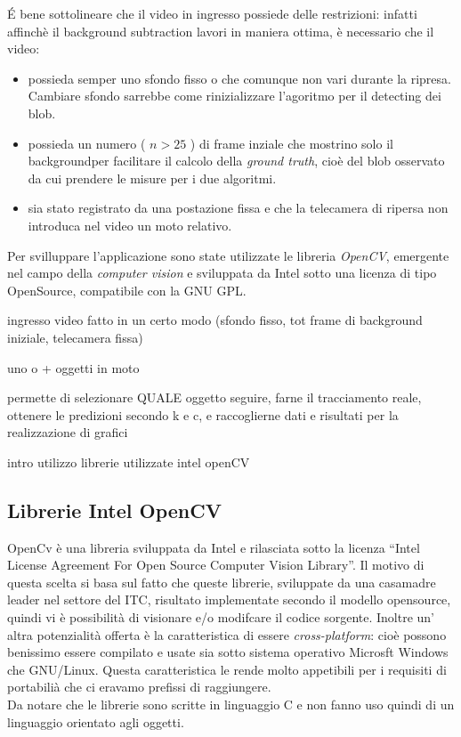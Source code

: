 \'E bene sottolineare che il video in ingresso possiede delle restrizioni: infatti affinchè il background subtraction lavori in maniera ottima, è necessario che il video:
\begin{itemize}
 \item possieda semper uno sfondo fisso o che comunque non vari durante la ripresa. Cambiare sfondo sarrebbe come rinizializzare l'agoritmo per il detecting dei blob.
\item possieda un numero ( $n > 25 $ ) di frame inziale che mostrino solo il backgroundper facilitare il calcolo della \textit{ground truth}, cioè del blob osservato da cui prendere le misure per i due algoritmi.
\item sia stato registrato da una postazione fissa e che la telecamera di ripersa non introduca nel video un moto relativo.
 \end{itemize}

Per svilluppare l'applicazione sono state utilizzate le libreria \textit{OpenCV}, emergente nel campo della \textit{computer vision}  e sviluppata da Intel sotto una licenza di tipo OpenSource, compatibile con la GNU GPL.


ingresso video fatto in un certo modo (sfondo fisso, tot frame di background iniziale, telecamera fissa)

uno o + oggetti in moto

permette di selezionare QUALE oggetto seguire, farne il tracciamento reale, ottenere le predizioni secondo k e c, e raccoglierne dati e risultati per la realizzazione di grafici

intro utilizzo librerie utilizzate intel openCV
\subsection{Librerie Intel OpenCV}
OpenCv è una libreria sviluppata da Intel e rilasciata sotto la licenza ``Intel License Agreement For Open Source Computer Vision Library''. Il motivo di questa scelta si basa sul fatto che queste librerie, sviluppate da una casamadre leader nel settore del ITC, risultato implementate secondo il modello opensource, quindi vi è possibilità di visionare e/o modifcare il codice sorgente. Inoltre un' altra potenzialità offerta è la caratteristica di essere \textit{cross-platform}: cioè possono benissimo essere compilato e usate sia sotto sistema operativo Microsft Windows che GNU/Linux. Questa caratteristica le rende molto appetibili per i requisiti di portabilià che ci eravamo prefissi di raggiungere.\\ Da notare che le librerie sono scritte in linguaggio C e non fanno uso quindi di un linguaggio orientato agli oggetti.

